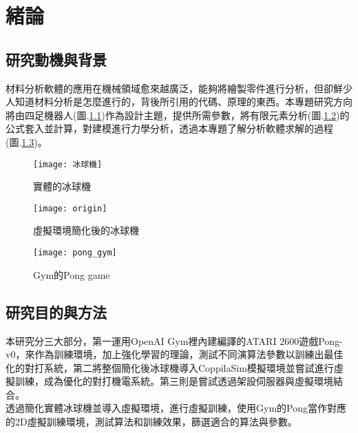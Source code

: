 \chapter{緒論}
\renewcommand{\baselinestretch}{10.0} %
\setcounter{page}{1}  %
\fontsize{14pt}{2.5pt}\sectionef
\section{研究動機與背景}
材料分析軟體的應用在機械領域愈來越廣泛，能夠將繪製零件進行分析，但卻鮮少人知道材料分析是怎麼進行的，背後所引用的代碼、原理的東西。本專題研究方向將由四足機器人(圖.\ref{fig.冰球機})作為設計主題，提供所需參數，將有限元素分析(圖.\ref{fig.模擬冰球機})的公式套入並計算，對建模進行力學分析，透過本專題了解分析軟體求解的過程(圖.\ref{fig.pong_gym})。\\

\begin{figure}[hbt!]
\begin{center}
\texttt{[image: 冰球機]}
\caption{\Large 實體的冰球機}\label{fig.冰球機}
\end{center}
\end{figure}
\begin{figure}[hbt!]
\begin{center}
\texttt{[image: origin]}
\caption{\Large 虛擬環境簡化後的冰球機}\label{fig.模擬冰球機}
\end{center}
\end{figure}
\begin{figure}[hbt!]
\begin{center}
\texttt{[image: pong\_gym]}
\caption{\Large Gym的Pong game}\label{fig.pong_gym}
\end{center}
\end{figure}


\section{研究目的與方法}
本研究分三大部分，第一運用OpenAI Gym裡內建編譯的ATARI 2600遊戲Pong-v0，來作為訓練環境，加上強化學習的理論，測試不同演算法參數以訓練出最佳化的對打系統，第二將整個簡化後冰球機導入CoppilaSim模擬環境並嘗試進行虛擬訓練，成為優化的對打機電系統。第三則是嘗試透過架設伺服器與虛擬環境結合。\\
 
透過簡化實體冰球機並導入虛擬環境，進行虛擬訓練，使用Gym的Pong當作對應的2D虛擬訓練環境，測試算法和訓練效果，篩選適合的算法與參數。\\

